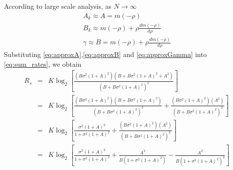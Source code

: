 \documentclass[12pt,journal,draftclsnofoot,onecolumn]{IEEEtran}
\begin{document}
According to large scale analysis, as $N \to \infty$
\begin{eqnarray}
A_k \approx A = m(-\rho)\label{eq:approxA}\\
B_k \approx m(-\rho) +\rho\frac{dm(-\rho)}{d\rho} \label{eq:approxB}\\
\gamma \approx   B = m(-\rho) +\rho\frac{dm(-\rho)}{d\rho} \label{eq:approxGamma}
\end{eqnarray}
Substituting \eqref{eq:approxA},\eqref{eq:approxB} and \eqref{eq:approxGamma} into \eqref{eq:sum_rates}, we obtain
\begin{eqnarray}
R_s &=& K\log_2\left[\frac{\left(B\sigma^2(1+ A)^2\right)\left(B + B\sigma^2(1+ A)^2 + A^2\right)}{\left(B + B\sigma^2(1+ A)^2\right)^2}\right]\\
&=&K\log_2\left[\frac{\left(B\sigma^2(1+ A)^2\right)\left(B + B\sigma^2(1+ A)^2 \right)}{\left(B + B\sigma^2(1+ A)^2\right)^2} + \frac{\left(B\sigma^2(1+ A)^2\right)\left(A^2\right)}{\left(B + B\sigma^2(1+ A)^2\right)^2}\right]\\
&=&K\log_2\left[\frac{\sigma^2(1+ A)^2}{1 + \sigma^2(1+ A)^2} + \frac{\left(B\sigma^2(1+ A)^2\right)\left(A^2\right)}{\left(B + B\sigma^2(1+ A)^2\right)^2}\right]\\
&=&K\log_2\left[\frac{\sigma^2(1+ A)^2}{1 + \sigma^2(1+ A)^2} + \frac{A^2}{B\left(1 + \sigma^2(1+ A)^2\right)} - \frac{A^2}{B\left(1 + \sigma^2(1+ A)^2\right)^2}\right]
\end{eqnarray}
%
%
%
%
\end{document}
